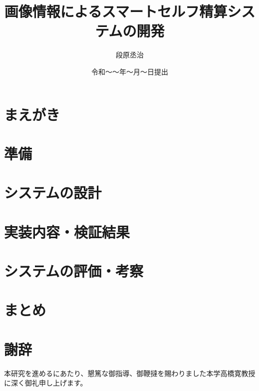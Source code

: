 

\newenvironment{indention}[1]{\par
\addtolength{\leftskip}{#1}
\begingroup}{\endgroup\par}

\title{画像情報によるスマートセルフ精算システムの開発}
\author{段原丞治}
\date{令和～～年～月～日提出}


\maketitle
\tableofcontents
\cleardoublepage
{}

\chapter{まえがき}


\chapter{準備}


\chapter{システムの設計}





\chapter{実装内容・検証結果}


\chapter{システムの評価・考察}


\chapter{まとめ}



\newpage
{}
\chapter*{謝辞}
本研究を進めるにあたり、懇篤な御指導、御鞭撻を賜わりました本学高橋寛教授に深く御礼申し上げます。

